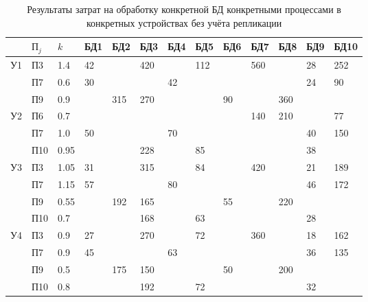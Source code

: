 \documentclass[russian,utf8,emptystyle]{eskdtext}
\begin{document}
\begin{longtable}{p{0.6cm}|p{1cm}|p{1cm}|p{1cm}|p{1cm}|p{1cm}|p{1cm}|p{1cm}|p{1cm}|p{1cm}|p{1cm}|p{1cm}|p{1cm}}
\caption{Результаты затрат на обработку конкретной БД конкретными процессами в конкретных
устройствах без учёта репликации}
\label{tab:bd-3} \\
                   &$\text{П}_j$ & $k$   & БД1 &  БД2 &  БД3 &  БД4 &  БД5 &  БД6 &  БД7 &  БД8 &  БД9 &  БД10 \\
\hline
\multirow{3}{*}{У1}&  П3         & 1.4   & 42  &      & 420  &      & 112  &      & 560  &      & 28   &  252  \\
                   &  П7         & 0.6   & 30  &      &      & 42   &      &      &      &      & 24   &  90   \\
                   &  П9         & 0.9   &     & 315  & 270  &      &      & 90   &      & 360  &      &       \\
\hline
\multirow{3}{*}{У2}&  П6         & 0.7   &     &      &      &      &      &      & 140  & 210  &      & 77    \\
                   &  П7         & 1.0   & 50  &      &      & 70   &      &      &      &      & 40   & 150   \\
                   &  П10        & 0.95  &     &      & 228  &      & 85   &      &      &      & 38   &       \\
\hline
\multirow{4}{*}{У3}&  П3         & 1.05  & 31  &      & 315  &      & 84   &      & 420  &      & 21   & 189   \\
                   &  П7         & 1.15  & 57  &      &      & 80   &      &      &      &      & 46   & 172   \\
                   &  П9         & 0.55  &     & 192  & 165  &      &      & 55   &      & 220  &      &       \\
                   &  П10        & 0.7   &     &      & 168  &      & 63   &      &      &      & 28   &       \\
\hline
\multirow{4}{*}{У4}&  П3         & 0.9   & 27  &      & 270  &      & 72   &      & 360  &      & 18   & 162   \\
                   &  П7         & 0.9   & 45  &      &      & 63   &      &      &      &      & 36   & 135   \\
                   &  П9         & 0.5   &     & 175  & 150  &      &      & 50   &      & 200  &      &       \\
                   &  П10        & 0.8   &     &      & 192  &      & 72   &      &      &      & 32   &       \\

\end{longtable}
\end{document}

